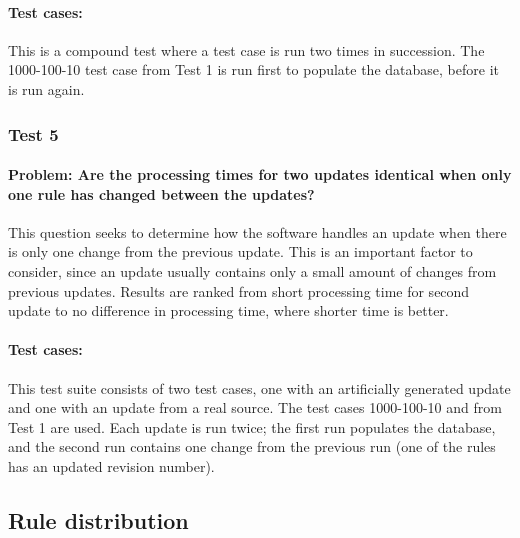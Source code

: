 \paragraph{Test cases:}
This is a compound test where a test case is run two times in succession. The
1000-100-10 test case from Test 1 is run first to populate the database, before
it is run again.

\subsubsection{Test 5}
\paragraph{Problem: Are the processing times for two updates identical when only
one rule has changed between the updates?}
This question seeks to determine how the software handles an update when there
is only one change from the previous update. This is an important factor to
consider, since an update usually contains only a small amount of changes from
previous updates. Results are ranked from short processing time for second
update to no difference in processing time, where shorter time is better.
\paragraph{Test cases:}
This test suite consists of two test cases, one with an artificially generated
update and one with an update from a real source. The test cases 1000-100-10 and
from Test 1 are used. Each update is run twice; the first run populates the
database, and the second run contains one change from the previous run (one of
the rules has an updated revision number).

\subsection{Rule distribution}
